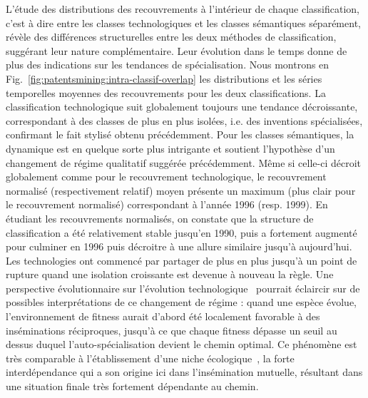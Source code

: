 {L'étude des distributions des recouvrements à l'intérieur de chaque classification, c'est à dire entre les classes technologiques et les classes sémantiques séparément, révèle des différences structurelles entre les deux méthodes de classification, suggérant leur nature complémentaire. Leur évolution dans le temps donne de plus des indications sur les tendances de spécialisation. Nous montrons en Fig.~\ref{fig:patentsmining:intra-classif-overlap} les distributions et les séries temporelles moyennes des recouvrements pour les deux classifications. La classification technologique suit globalement toujours une tendance décroissante, correspondant à des classes de plus en plus isolées, i.e. des inventions spécialisées, confirmant le fait stylisé obtenu précédemment. Pour les classes sémantiques, la dynamique est en quelque sorte plus intrigante et soutient l'hypothèse d'un changement de régime qualitatif suggérée précédemment. Même si celle-ci décroit globalement comme pour le recouvrement technologique, le recouvrement normalisé (respectivement relatif) moyen présente un maximum (plus clair pour le recouvrement normalisé) correspondant à l'année 1996 (resp. 1999). En étudiant les recouvrements normalisés, on constate que la structure de classification a été relativement stable jusqu'en 1990, puis a fortement augmenté pour culminer en 1996 puis décroitre à une allure similaire jusqu'à aujourd'hui. Les technologies ont commencé par partager de plus en plus jusqu'à un point de rupture quand une isolation croissante est devenue à nouveau la règle. Une perspective évolutionnaire sur l'évolution technologique~\cite{ziman2003technological} pourrait éclaircir sur de possibles interprétations de ce changement de régime : quand une espèce évolue, l'environnement de fitness aurait d'abord été localement favorable à des inséminations réciproques, jusqu'à ce que chaque fitness dépasse un seuil au dessus duquel l'auto-spécialisation devient le chemin optimal. Ce phénomène est très comparable à l'établissement d'une niche écologique~\cite{holland2012signals}, la forte interdépendance qui a son origine ici dans l'insémination mutuelle, résultant dans une situation finale très fortement dépendante au chemin.
}


